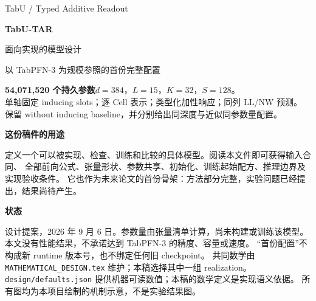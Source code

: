 \documentclass[11pt,UTF8,fontset=fandol]{ctexart}
\begin{document}
\hypersetup{pageanchor=false}
\begin{titlepage}
\vspace*{17mm}
{\color{teal}\large TabU / Typed Additive Readout}\par\vspace{8mm}
{\Huge\bfseries\color{ink} TabU-TAR}\par\vspace{5mm}
{\LARGE 面向实现的模型设计}\par\vspace{4mm}
{\large 以 TabPFN-3 为规模参照的首份完整配置}\par\vspace{12mm}
\begin{decision}
\textbf{54,071,520 个持久参数}\quad $d=384$，$L=15$，$K=32$，$S=128$。\\
单轴固定 inducing slots；逐 Cell 表示；类型化加性响应；同列 LL/NW 预测。\\
保留 without inducing baseline，并分别给出同深度与近似同参数量配置。
\end{decision}
\vspace{8mm}
\textbf{这份稿件的用途}\par
定义一个可以被实现、检查、训练和比较的具体模型。阅读本文件即可获得输入合同、
全部前向公式、张量形状、参数共享、初始化、训练起始配方、推理边界及实现验收条件。
它也作为未来论文的首份骨架：方法部分完整，实验问题已经提出，结果尚待产生。
\par\vspace{4mm}
\textbf{状态}\par
设计提案，2026 年 9 月 6 日。参数量由张量清单计算，尚未构建或训练该模型。
本文没有性能结果，不承诺达到 TabPFN-3 的精度、容量或速度。
“首份配置”不构成新 runtime 版本号，也不绑定任何旧 checkpoint。
\vfill
\small
共同数学由 \texttt{MATHEMATICAL\_DESIGN.tex} 维护；本稿选择其中一组 realization。
\texttt{design/defaults.json} 提供机器可读数值；本稿的数学定义是实现语义依据。
所有图均为本项目绘制的机制示意，不是实验结果图。
\end{titlepage}
\hypersetup{pageanchor=true}

\begin{abstract}
TabU-TAR 将表格预测表达为：从可见 Cell 构造证据，在表格轴向传播中形成 Cell、Unit、
Feature 三类表示，再通过共享的类型化线性读出得到加性响应，并以同列可见样本形成数值或离散预测。
本文把这一结构具体化为约 54M 参数的模型，参考 TabPFN-3 的公开规模与若干工程默认，
采用固定 128 槽的列内 inducing 通信和直接行内交互。与压缩为单一行表示的路线相比，
本设计保留逐 Cell 查询接口，同时承担更大的二维激活成本。
本文完整定义前向、局部线性求解、训练梯度和失败状态；指出默认 terminal 对 Feature 公共平移不敏感，
并把这一限制作为明确的模型取舍。所列训练配方用于开始实现与验证，尚不是经过实验选定的预训练方案。
\end{abstract}
\tableofcontents
\clearpage
\end{document}
